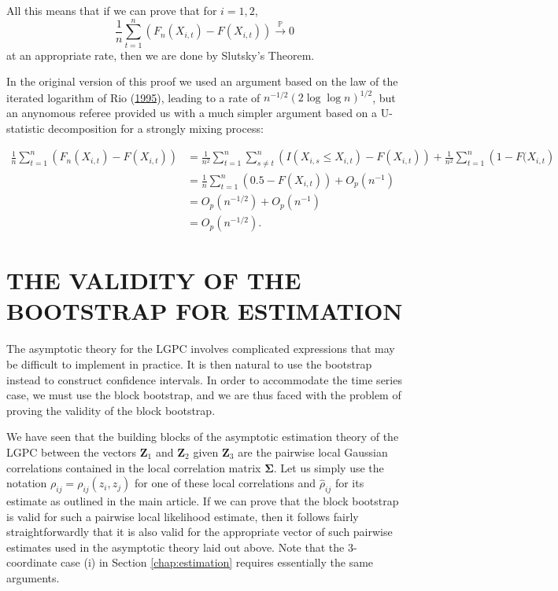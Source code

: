 \documentclass[
  12pt,
  letterpaper]{article}
\numberwithin{equation}{section}
\newcommand{\Z}{\bm{Z}}
\newcommand{\hrho}{\widehat{\rho}}
\newcommand{\fSigma}{\bm{\Sigma}}
\begin{document}
All this means that if we can prove that for \(i=1,2\),
\[\frac{1}{n}\sum_{t=1}^n(F_n(X_{i,t}) - F(X_{i,t})) \stackrel{\mathbb{P}}{\rightarrow} 0\]
at an appropriate rate, then we are done by Slutsky's Theorem.

In the original version of this proof we used an argument based on the law of the iterated logarithm of Rio (\protect\hyperlink{ref-rio1995functional}{1995}), leading to a rate of \(n^{-1/2}(2 \log \log n )^{1/2}\), but an anynomous referee provided us with a much simpler argument based on a U-statistic decomposition for a strongly mixing process:

\begin{align*}
\frac{1}{n}\sum_{t=1}^n \left(F_n(X_{i,t}) - F(X_{i,t})\right) &= 
\frac{1}{n^2}\sum_{t=1}^n\sum_{s \neq t}^n \left(I(X_{i,s} \leq X_{i,t}) - F(X_{i,t})\right) + \frac{1}{n^2}\sum_{t=1}^n \left(1 - F(X_{i,t}\right) \\
&= \frac{1}{n} \sum_{t=1}^n \left(0.5 - F(X_{i,t})\right) + O_p\left(n^{-1}\right) \\
&= O_p\left(n^{-1/2}\right) + O_p\left(n^{-1}\right) \\
&= O_p\left(n^{-1/2}\right).
\end{align*}

\hypertarget{validity-bootstrap}{%
\section{THE VALIDITY OF THE BOOTSTRAP FOR ESTIMATION}\label{validity-bootstrap}}

The asymptotic theory for the LGPC involves complicated expressions that may be difficult to implement in practice. It is then natural to use the bootstrap instead to construct confidence intervals. In order to accommodate the time series case, we must use the block bootstrap, and we are thus faced with the problem of proving the validity of the block bootstrap.

We have seen that the building blocks of the asymptotic estimation theory of the LGPC between the vectors \(\Z_1\) and \(\Z_2\) given \(\Z_3\) are the pairwise local Gaussian correlations contained in the local correlation matrix \(\fSigma\). Let us simply use the notation \(\rho_{ij} = \rho_{ij}(z_i, z_j)\) for one of these local correlations and \(\hrho_{ij}\) for its estimate as outlined in the main article. If we can prove that the block bootstrap is valid for such a pairwise local likelihood estimate, then it follows fairly straightforwardly that it is also valid for the appropriate vector of such pairwise estimates used in the asymptotic theory laid out above. Note that the 3-coordinate case (i) in Section \ref{chap:estimation} requires essentially the same arguments.
\end{document}
